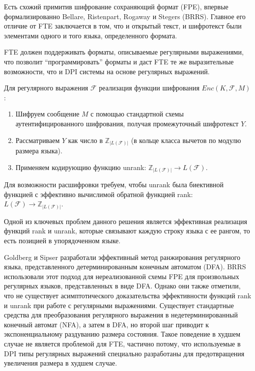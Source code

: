 Есть схожий примитив шифрование сохраняющий формат (FPE), впервые формализированно Bellare, Ristenpart, Rogaway и Stegers (BRRS).
Главное его отличие от FTE заключается в том, что и открытый текст, и шифротекст были элементами одного и того языка, определенного формата.

FTE должен поддерживать форматы, описываемые регулярными выражениями,
что позволит ``программировать'' форматы и даст FTE те же выразительные возможности, что и DPI системы на основе регулярных выражений.

Для регулярного выражения $\mathcal{F}$ реализация функции шифрования $Enc(K, \mathcal{F}, M)$:

\begin{enumerate}
    \item Шифруем сообщение $M$ с помощью стандартной схемы аутентифицированного шифрования, получая промежуточный шифротекст $Y$.
    \item Рассматриваем $Y$ как число в $\mathbb{Z}_{|L(\mathcal{F})|}$ (в кольце класса вычетов по модулю размера языка).
    \item Применяем кодирующию функцию unrank: $\mathbb{Z}_{|L(\mathcal{F})|} \rightarrow L(\mathcal{F})$.
\end{enumerate}


Для возможности расшифровки требуем, чтобы unrank была биективной функцией с эффективно вычислимой обратной функцией rank:
$L(\mathcal{F}) \rightarrow \mathbb{Z}_{|L(\mathcal{F})|}$.


Одной из ключевых проблем данного решения является эффективная реализация функций rank и unrank,
которые связывают каждую строку языка с ее рангом, то есть позицией в упорядоченном языке.

Goldberg и Sipser разработали эффективный метод ранжирования регулярного языка,
представленного детерминированным конечным автоматом (DFA).
BRRS использовали этот подход для нереализованной схемы FPE для произвольных регулярных языков,
представленных в виде DFA. Однако они также отметили, что не существует асимптотического доказательства
эффективности функций rank и unrank при работе с регулярными выражениями.
Существует стандартные средства для преобразования регулярного выражения в недетерминированный конечный автомат (NFA),
а затем в DFA, но второй шаг приводит к экспоненциальному раздуванию размера состояния.
Такое поведение в худшем случае не является проблемой для FTE, частично потому,
что используемые в DPI типы регулярных выражений специально разработаны для предотвращения увеличения размера в худшем случае.

